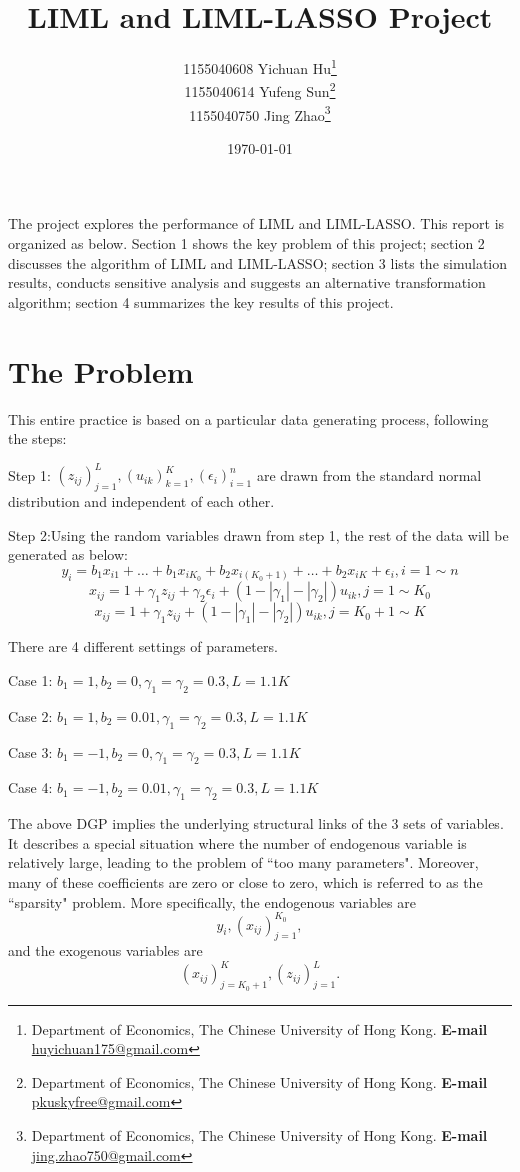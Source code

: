 \documentclass[12pt,pdftex,letterpaper]{article}
\title{\large LIML and LIML-LASSO Project}
\date{\today}
\author{1155040608 Yichuan Hu\footnote{Department of Economics, The Chinese University of Hong Kong.  {\bf E-mail}
\href{mailto:huyichuan175@gmail.com}{huyichuan175@gmail.com}} \\
1155040614 Yufeng Sun\footnote{Department of Economics, The Chinese University of Hong Kong. {\bf E-mail}\href{mailto: pkuskyfree@gmail.com}{ pkuskyfree@gmail.com}}\\
1155040750 Jing Zhao\footnote{Department of Economics, The Chinese University of Hong Kong. {\bf E-mail}\href{mailto: jing.zhao750@gmail.com}{ jing.zhao750@gmail.com}}
}
\begin{document}
\maketitle
\begin{center}
\vspace{3mm}
\end{center}


     The project explores the performance of LIML and LIML-LASSO. This report is organized as below. Section 1 shows the key problem of this project; section 2 discusses the algorithm of LIML and LIML-LASSO; section 3 lists the simulation results, conducts sensitive analysis and suggests an alternative transformation algorithm; section 4 summarizes the key results of this project.
     
\section{The Problem}   
\indent   This entire practice is based on a particular data generating process, following the steps:

   Step 1: $(z_{ij})_{j=1}^{L},(u_{ik})_{k=1}^{K},(\epsilon_{i})_{i=1}^{n}$ are drawn from the standard normal distribution and independent of each other.
   
   Step 2:Using the random variables drawn from step 1, the rest of the data will be generated as below:
   $$y_{i}=b_{1}x_{i1}+\dots+b_{1}x_{iK_{0}}+b_{2}x_{i(K_{0}+1)}+\dots+b_{2}x_{iK}+\epsilon_{i}, i=1 \sim n$$
   $$x_{ij}=1+\gamma_{1}z_{ij}+\gamma_{2}\epsilon_{i}+(1-|\gamma_{1}|-|\gamma_{2}|)u_{ik},j=1\sim K_{0}$$
   $$x_{ij}=1+\gamma_{1}z_{ij}+(1-|\gamma_{1}|-|\gamma_{2}|)u_{ik},j=K_{0}+1 \sim K$$
   
   There are 4 different settings of parameters.
   
   Case 1: $b_{1}=1,b_{2}=0,\gamma_{1}=\gamma_{2}=0.3,L=1.1K$
   
   Case 2: $b_{1}=1,b_{2}=0.01,\gamma_{1}=\gamma_{2}=0.3,L=1.1K$
   
   Case 3: $b_{1}=-1,b_{2}=0,\gamma_{1}=\gamma_{2}=0.3,L=1.1K$
   
   Case 4: $b_{1}=-1,b_{2}=0.01,\gamma_{1}=\gamma_{2}=0.3,L=1.1K$
   
   The above DGP implies the underlying structural links of the 3 sets of variables. It describes a special situation where the number of endogenous variable is relatively large, leading to the problem of ``too many parameters". Moreover, many of these coefficients are zero or close to zero, which is referred to as the ``sparsity" problem. More specifically, the endogenous variables are
      $$y_{i},(x_{ij})_{j=1}^{K_{0}},$$
and the exogenous variables are
      $$(x_{ij})_{j=K_{0}+1}^{K},(z_{ij})_{j=1}^{L}.$$
      
\end{document}
